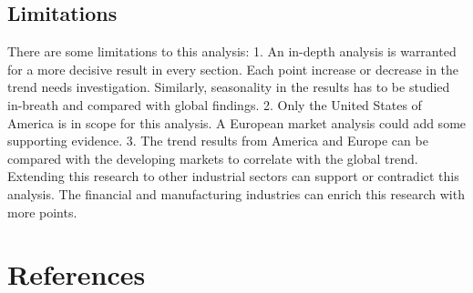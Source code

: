 \documentclass[
  man,floatsintext]{apa7}
\begin{document}
\hypertarget{limitations}{%
\subsection{Limitations}\label{limitations}}

There are some limitations to this analysis:
1. An in-depth analysis is warranted for a more decisive result in every section. Each point increase or decrease in the trend needs investigation. Similarly, seasonality in the results has to be studied in-breath and compared with global findings.
2. Only the United States of America is in scope for this analysis. A European market analysis could add some supporting evidence.
3. The trend results from America and Europe can be compared with the developing markets to correlate with the global trend.\\
Extending this research to other industrial sectors can support or contradict this analysis. The financial and manufacturing industries can enrich this research with more points.

\newpage

\hypertarget{references}{%
\section{References}\label{references}}

\begingroup
\setlength{\parindent}{-0.5in}
\setlength{\leftskip}{0.5in}
\end{document}
